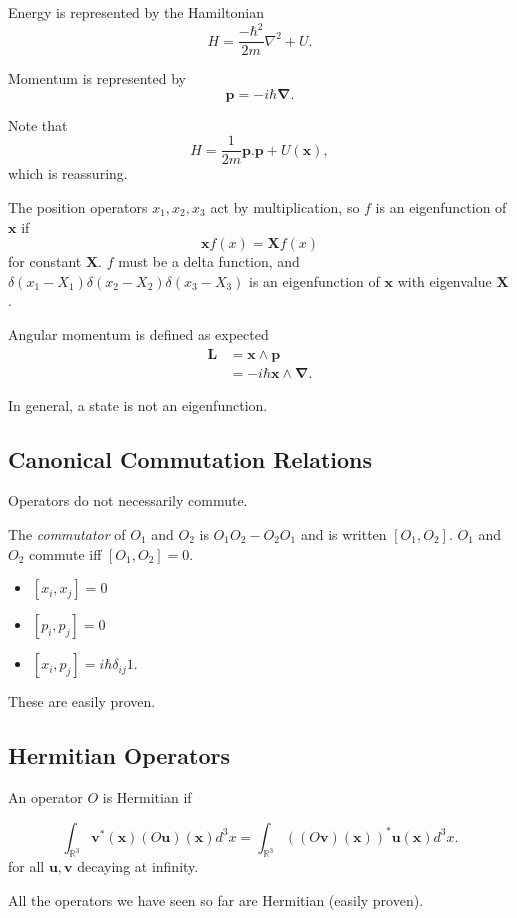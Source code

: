 \documentclass[a4paper]{article}
\newcommand{\RRR}{\mathbb{R}^{3}}
\newcommand{\mom}{\mathbf{p}}
\newcommand{\posn}{\mathbf{x}}
\newcommand{\amom}{\mathbf{L}}
\newcommand{\com}[2]{\left[ #1,#2 \right]}
\begin{document}
Energy is represented by the Hamiltonian
\[
H = \frac{-\hbar^2}{2 m} \nabla^2 + U.
\]

Momentum is represented by 
\[
\mom = - i \hbar \mathbf{\nabla}.
\]

Note that 
\[
H = \frac{1}{2 m}\mom . \mom + U(\posn),
\]
which is reassuring.

The position operators $x_1, x_2, x_3$ act by multiplication, so $f$ is an
eigenfunction of $\posn$ if
\[
\posn f(x) = \mathbf{X} f(x)
\]
for constant $\mathbf{X}$.  $f$ must be a delta function, and
$\delta(x_1 - X_1)\delta(x_2 - X_2) \delta(x_3 - X_3)$ is an eigenfunction of
$\posn$ with eigenvalue $\mathbf{X}$.

Angular momentum is defined as expected
\begin{align*}
\amom &= \posn \wedge \mom \\
&=-i \hbar \posn \wedge \mathbf{\nabla}.
\end{align*}

In general, a state is not an eigenfunction.

\subsection{Canonical Commutation Relations}

Operators do not necessarily commute.

The \emph{commutator} of $O_1$ and $O_2$ is $O_1 O_2 - O_2 O_1$ and is written
$\com{O_1}{O_2}$.  $O_1$ and $O_2$ commute iff $\com{O_1}{O_2}=0$.

\begin{itemize}
\item $\com{x_i}{x_j} = 0$
\item $\com{p_i}{p_j} = 0$
\item $\com{x_i}{p_j} = i \hbar \delta_{ij} 1$.
\end{itemize}

These are easily proven.

\subsection{Hermitian Operators}

An operator $O$ is Hermitian if

\[
\int_{\RRR} \mathbf{v}^{*}(\posn) (O\mathbf{u})(\posn)d^3x =
\int_{\RRR} ( (O\mathbf{v})(\posn))^* \mathbf{u}(\posn)d^3x.
\]
for all $\mathbf{u}, \mathbf{v}$ decaying at infinity.

All the operators we have seen so far are Hermitian (easily proven).
\end{document}
